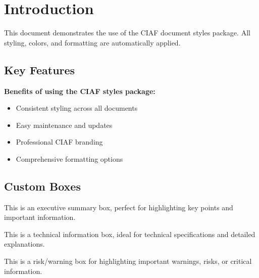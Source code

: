 \documentclass[12pt,a4paper]{article}
\begin{document}
\maketitle
\ciafbigspace

\section{Introduction}

This document demonstrates the use of the CIAF document styles package. All styling, colors, and formatting are automatically applied.

\subsection{Key Features}

\begin{valuebox}
\textbf{Benefits of using the CIAF styles package:}
\begin{itemize}
    \item Consistent styling across all documents
    \item Easy maintenance and updates
    \item Professional CIAF branding
    \item Comprehensive formatting options
\end{itemize}
\end{valuebox}

\subsection{Custom Boxes}

\begin{executivebox}
This is an executive summary box, perfect for highlighting key points and important information.
\end{executivebox}

\ciafvspace

\begin{technicalbox}
This is a technical information box, ideal for technical specifications and detailed explanations.
\end{technicalbox}

\ciafvspace

\begin{riskbox}
This is a risk/warning box for highlighting important warnings, risks, or critical information.
\end{riskbox}
\end{document}
